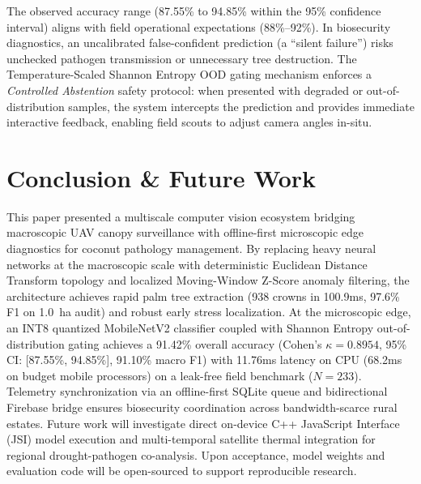\documentclass[conference,a4paper]{IEEEtran}
\begin{document}
The observed accuracy range (87.55\% to 94.85\% within the 95\% confidence interval) aligns with field operational expectations (88\%--92\%). In biosecurity diagnostics, an uncalibrated false-confident prediction (a ``silent failure'') risks unchecked pathogen transmission or unnecessary tree destruction. The Temperature-Scaled Shannon Entropy OOD gating mechanism enforces a \textit{Controlled Abstention} safety protocol: when presented with degraded or out-of-distribution samples, the system intercepts the prediction and provides immediate interactive feedback, enabling field scouts to adjust camera angles in-situ.

\section{Conclusion \& Future Work}
This paper presented a multiscale computer vision ecosystem bridging macroscopic UAV canopy surveillance with offline-first microscopic edge diagnostics for coconut pathology management. By replacing heavy neural networks at the macroscopic scale with deterministic Euclidean Distance Transform topology and localized Moving-Window Z-Score anomaly filtering, the architecture achieves rapid palm tree extraction (938 crowns in 100.9ms, 97.6\% F1 on 1.0~ha audit) and robust early stress localization. At the microscopic edge, an INT8 quantized MobileNetV2 classifier coupled with Shannon Entropy out-of-distribution gating achieves a 91.42\% overall accuracy (Cohen's $\kappa = 0.8954$, 95\% CI: [87.55\%, 94.85\%], 91.10\% macro F1) with 11.76ms latency on CPU (68.2ms on budget mobile processors) on a leak-free field benchmark ($N=233$). Telemetry synchronization via an offline-first SQLite queue and bidirectional Firebase bridge ensures biosecurity coordination across bandwidth-scarce rural estates. Future work will investigate direct on-device C++ JavaScript Interface (JSI) model execution and multi-temporal satellite thermal integration for regional drought-pathogen co-analysis. Upon acceptance, model weights and evaluation code will be open-sourced to support reproducible research.

\let\oldthebibliography\thebibliography
\let\endoldthebibliography\endthebibliography
\renewenvironment{thebibliography}[1]{
  \begin{oldthebibliography}{#1}
    \setlength{\itemsep}{0.2pt}
    \setlength{\parskip}{0pt}
}{
  \end{oldthebibliography}
}
\end{document}
